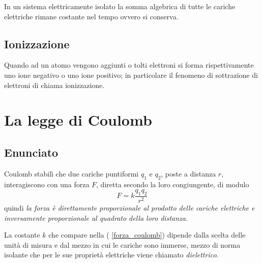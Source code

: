 \documentclass[class=book, crop=false, oneside, 12pt]{standalone}
\begin{document}
In un sistema elettricamente isolato la somma algebrica di tutte le cariche elettriche rimane costante nel tempo ovvero si conserva. 

\subsection{Ionizzazione}

Quando ad un atomo vengono aggiunti o tolti elettroni si forma rispettivamente uno ione negativo o uno ione positivo; in particolare il fenomeno di sottrazione di elettroni di chiama ionizzazione.

\section{La legge di Coulomb}

\subsection{Enunciato}

Coulomb stabilì che due cariche puntiformi \(q_1\) e \(q_2\), poste a distanza \(r\), interagiscono con una forza \(F\), diretta secondo la loro congiungente, di modulo
\begin{equation} \label{forza_coulomb}
    F = k \frac{q_1 q_2}{r^2}
\end{equation}
quindi \emph{la forza è direttamente proporzionale al prodotto delle cariche elettriche e inversamente proporzionale al quadrato della loro distanza.}

La costante \(k\) che compare nella ( \ref{forza_coulomb}) dipende dalla scelta delle unità di misura e dal mezzo in cui le cariche sono immerse, mezzo di norma isolante che per le sue proprietà elettriche viene chiamato \emph{dielettrico}. 
\end{document}
